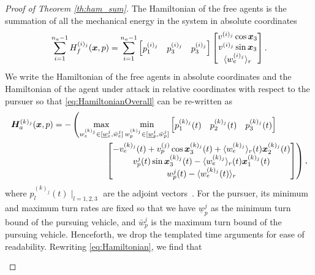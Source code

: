 \begin{proof}[Proof of Theorem \ref{th:ham_sum}]
The Hamiltonian of the free agents is the summation of all the mechanical energy in the system in absolute coordinates \ie %
%
\begin{align}
	\sum_{i=1}^{n_a-1} H^{(i)_j}_f(\bm{x}, p) = \sum_{i=1}^{n_a-1} \begin{bmatrix}
		p_1^{(i)_j} & p_3^{(i)_j} & p_3^{(i)_j}
	\end{bmatrix} 
	\begin{bmatrix}
		v^{(i)_j} \cos \bm{x}_3 \\ v^{(i)_j} \sin \bm{x}_3 \\ \langle w_e^{(i)_j}\rangle_r
	\end{bmatrix}.
\end{align}
%
We write the Hamiltonian of the free agents in absolute coordinates and the Hamiltonian of the agent under attack in relative coordinates with respect to the pursuer so that \eqref{eq:HamiltonianOverall} can be re-written as
%
\begin{align}
	\bm{H}^{(k)_j}_a(\bm{x}, p)&= - \left(\max_{w_e^{(k)_j} \in [\underline{w}_e^j, \bar{w}_e^j]}  \min_{w_p^{(k)_j}  \in [\underline{w}_p^{j}, \bar{w}_p^j]}  \begin{bmatrix}p_1^{(k)_j}(t) & p_2^{(k)_j}(t) & p_3^{(k)_j}(t) \end{bmatrix}\right. \nonumber \\ 
	& \qquad\qquad\qquad \left. 
	\begin{bmatrix}
		-v_e^{(k)_j}(t) + v_p^{(j)} \cos \bm{x}_3^{(k)_j}(t) + \langle w_e^{(k)_j} \rangle_r (t) \bm{x}_2^{(k)_j}(t)
		\\ 
		v_p^{j}(t)\sin \bm{x}_3^{(k)_j}(t) -\langle w_e^{(k)_j} \rangle_r (t) \bm{x}_1^{(k)_j}(t)
		\\ 
		w_p^j(t) - \langle w_e^{(k)_j}(t) \rangle_r
	\end{bmatrix}\right),
	\label{eq:Hamiltonian}
\end{align}
%
where $p_l^{(k)_j}(t)\mid_{l=1,2,3}$ are the adjoint vectors~\cite{Merz1972}. For the pursuer, its minimum and maximum turn rates are fixed so that we have $\underline{w}_p^{j}$ as the minimum turn bound of the pursuing vehicle, and $\bar{w}_p^j$ is the maximum turn bound of the pursuing vehicle. Henceforth, we drop the templated time arguments for ease of readability. Rewriting \eqref{eq:Hamiltonian}, we find that %
%
\begin{align}
	\begin{split}

\end{split}
\end{align}
\end{proof}
